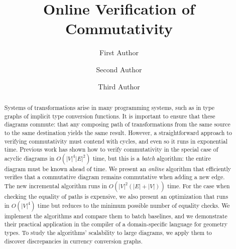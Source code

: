 \documentclass[sigplan,review,anonymous]{acmart}
\begin{document}
\title{Online Verification of Commutativity}
%
%
\author{First Author}
\author{Second Author}
\authornotemark[1]

\author{Third Author}

\begin{abstract}
Systems of transformations arise in many programming systems, such as in type graphs of implicit type conversion functions.
It is important to ensure that these diagrams commute: that any composing path of transformations from the same source to the same destination yields the same result.
However, a straightforward approach to verifying commutativity must contend with cycles, and even so it runs in exponential time.
Previous work has shown how to verify commutativity in the special case of acyclic diagrams in $O(|V|^4|E|^2)$ time,
but this is a \emph{batch} algorithm: the entire diagram must be known ahead of time.
We present an \emph{online} algorithm that efficiently verifies that a commutative diagram remains commutative when adding a new edge.
The new incremental algorithm runs in $O(|V|^2(|E| + |V|))$ time.
For the case when checking the equality of paths is expensive, we also present an optimization that runs in $O(|V|^4)$ time but reduces to the minimum possible number of equality checks.
We implement the algorithms and compare them to batch baselines, and we demonstrate their practical application in the compiler of a domain-specific language for geometry types.
To study the algorithms' scalability to large diagrams, we apply them to discover discrepancies in currency conversion graphs.
\end{abstract}

\maketitle
\end{document}
